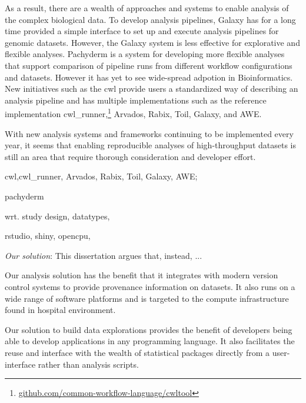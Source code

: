As a result, there are a wealth of approaches and systems to enable analysis of
the complex biological data. To develop analysis pipelines, Galaxy\cite{galaxy}
has for a long time provided a simple interface to set up and execute analysis
pipelines for genomic datasets. However, the Galaxy system is less effective for
explorative and flexible analyses.\cite{spjuth2015experiences}
Pachyderm\cite{pachyderm} is a system for developing more flexible analyses that
support comparison of pipeline runs from different workflow configurations and
datasets. However it has yet to see wide-spread adpotion in Bioinformatics.
New initiatives such as the \gls{cwl} provide users a standardized way of
describing an analysis pipeline and has multiple implementations such as
the reference implementation
cwl\_runner,\footnote{\url{github.com/common-workflow-language/cwltool}}
Arvados,\cite{arvados} Rabix,\cite{rabix} Toil,\cite{toil} Galaxy,\cite{galaxy}
and AWE.\cite{awe} 


With new analysis systems and frameworks continuing to be implemented every
year, it seems that enabling reproducible analyses of high-throughput datasets
is still an area that require thorough consideration and developer effort.

\begin{enumerate*}[label=(\roman*)]
    \item cwl,cwl\_runner, Arvados, Rabix, Toil, Galaxy,
        AWE;   
    \item pachyderm
    \item wrt. study design, datatypes, 
    \item rstudio, shiny, opencpu,
\end{enumerate*} 


\emph{Our solution}: 
This dissertation argues that, instead, ... 

Our analysis solution has the benefit that it integrates with modern version
control systems to provide provenance information on datasets. It also runs on a
wide range of software platforms and is targeted to the compute infrastructure
found in hospital environment. 

Our solution to build data explorations provides the benefit of developers being
able to develop applications in any programming language. It also facilitates
the reuse and interface with the wealth of statistical packages directly from a
user-interface rather than analysis scripts. 

